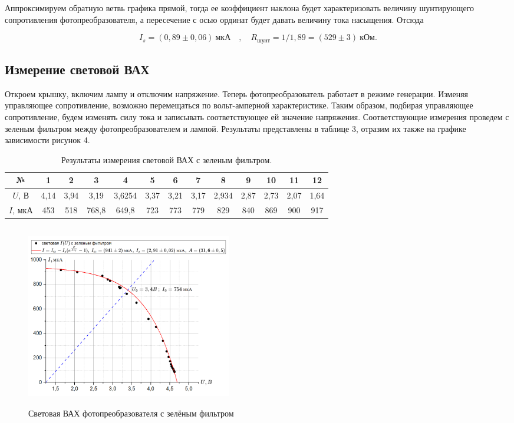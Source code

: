 \documentclass[a4paper, 12pt]{article}
\begin{document}
Аппроксимируем обратную ветвь графика прямой, тогда ее коэффициент наклона будет характеризовать величину шунтирующего сопротивления фотопреобразователя, а пересечение с осью ординат будет давать величину тока насыщения. Отсюда 

$$
        \boxed{I_s = (0,89 \pm 0,06)\ мкА} \quad, \quad \boxed{R_{шунт} = 1 / 1,89 = (529 \pm 3)\ кОм}.
        
$$


\subsection{Измерение световой ВАХ}
Откроем крышку, включим лампу и отключим напряжение. Теперь фотопреобразователь работает в режиме генерации. Изменяя управляющее сопротивление, возможно перемещаться по вольт-амперной характеристике. Таким образом, подбирая управляющее сопротивление, будем изменять силу тока и записывать соответствующее ей значение напряжения. Соответствующие измерения проведем с зеленым фильтром между фотопреобразователем и лампой. Результаты представлены в таблице 3, отразим их также на графике зависимости рисунок 4.


    
    \begin{table}[!ht]
    \centering
    \begin{tabular}{|c|c|c|c|c|c|c|c|c|c|c|c|c|}
    \hline
        № & 1 & 2 & 3 & 4 & 5 & 6 & 7 & 8 & 9 & 10 & 11 & 12 \\ \hline
        $U$, В & 4,14 & 3,94 & 3,19 & 3,6254 & 3,37 & 3,21 & 3,17 & 2,934 & 2,87 & 2,73 & 2,07 & 1,64 \\ \hline
        $I$, мкА & 453 & 518 & 768,8 & 649,8 & 723 & 773 & 779 & 829 & 840 & 869 & 900 & 917 \\ \hline
        
    \end{tabular}
    \caption{Результаты измерения световой ВАХ с зеленым фильтром.}
    \label{table_light_VAC_with_filter}
    \end{table}
\newpage
    
\begin{figure}[h!]
    \centering %
    \includegraphics[width=9cm,height=8cm]{световая.png} %
    \caption{Световая ВАХ фотопреобразователя с зелёным фильтром}\label{fig:sun} %
\end{figure}
\end{document}
